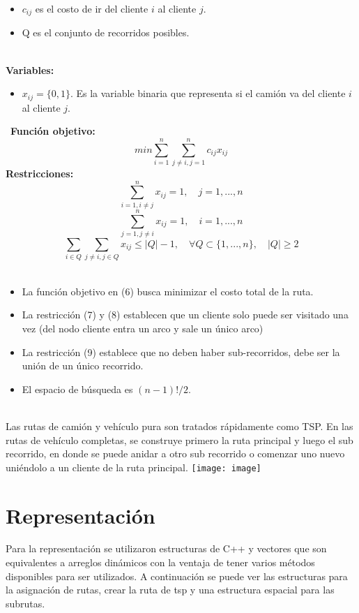 \documentclass[letter, 10pt]{article}
\begin{document}
\begin{itemize}

    \item $c_{ij}$ es el costo de ir del cliente $i$ al cliente $j$.
    \item Q es el conjunto de recorridos posibles.
\end{itemize} 
\\
\textbf{Variables:}
\begin{itemize}
    \item $x_{ij} =\{0,1\}$. Es la variable binaria que representa si el camión va del cliente $i$ al cliente $j$. 
\end{itemize}
\
\textbf{Función objetivo:}
\begin{equation}
    min \sum_{i = 1}^{n}\sum_{j \neq i, j = 1}^{n} c_{ij}x_{ij}
\end{equation}
\textbf{Restricciones:}
\begin{equation}
    \sum_{i = 1, i \neq j}^{n} x_{ij} = 1, \quad j = 1,...,n
\end{equation}
\begin{equation}
    \sum_{j = 1, j \neq i}^{n} x_{ij} = 1, \quad i = 1,...,n
\end{equation}
\begin{equation}
    \sum_{i\in Q}\sum_{j \neq i, j\in Q} x_{ij} \leq |Q| - 1 , \quad \forall Q \subset \{1,...,n\}, \quad  |Q|\geq 2
\end{equation}
\\
\begin{itemize}
    \item La función objetivo en (6) busca minimizar el costo total de la ruta.
    \item La restricción (7) y (8) establecen que un cliente solo puede ser visitado una vez (del nodo cliente entra un arco y sale un único arco)
    \item La restricción (9) establece que no deben haber sub-recorridos, debe ser la unión de un único recorrido.
    \item El espacio de búsqueda es $(n-1)!/2$.
\end{itemize}
\\
Las rutas de camión y vehículo pura son tratados rápidamente como TSP. En las rutas de vehículo completas, se construye primero la ruta principal y luego el sub recorrido, en donde se puede anidar a otro sub recorrido o comenzar uno nuevo uniéndolo a un cliente de la ruta principal.
\texttt{[image: image]}
\newpage

\section{Representaci\'on}
Para la representación se utilizaron estructuras de C++ y vectores que son equivalentes a arreglos dinámicos con la ventaja de tener varios métodos disponibles para ser utilizados. A continuación se puede ver las estructuras para la asignación de rutas, crear la ruta de tsp y una estructura espacial para las subrutas. 
\end{document}
